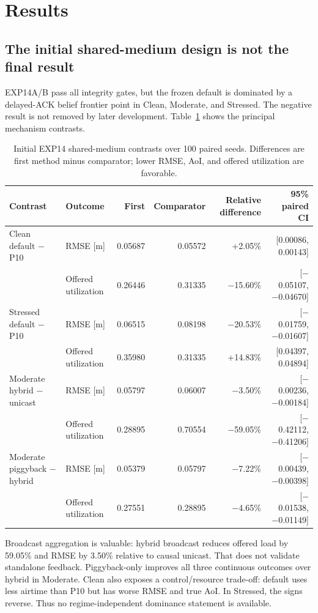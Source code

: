 \section{Results}
\label{sec:s2-results}

\subsection{The initial shared-medium design is not the final result}

EXP14A/B pass all integrity gates, but the frozen default is dominated by a
delayed-ACK belief frontier point in Clean, Moderate, and Stressed. The
negative result is not removed by later development. Table~\ref{tab:s2-initial}
shows the principal mechanism contrasts.

\begin{table}[t]
\centering
\caption{Initial EXP14 shared-medium contrasts over 100 paired seeds.
Differences are first method minus comparator; lower RMSE, AoI, and offered
utilization are favorable.}
\label{tab:s2-initial}
\scriptsize
\begin{tabular}{llrrrr}
\toprule
Contrast & Outcome & First & Comparator & Relative difference & 95\% paired CI \\
\midrule
Clean default $-$ P10 & RMSE [m] & 0.05687 & 0.05572 & +2.05\% & [0.00086, 0.00143] \\
 & Offered utilization & 0.26446 & 0.31335 & $-$15.60\% & [$-$0.05107, $-$0.04670] \\
Stressed default $-$ P10 & RMSE [m] & 0.06515 & 0.08198 & $-$20.53\% & [$-$0.01759, $-$0.01607] \\
 & Offered utilization & 0.35980 & 0.31335 & +14.83\% & [0.04397, 0.04894] \\
Moderate hybrid $-$ unicast & RMSE [m] & 0.05797 & 0.06007 & $-$3.50\% & [$-$0.00236, $-$0.00184] \\
 & Offered utilization & 0.28895 & 0.70554 & $-$59.05\% & [$-$0.42112, $-$0.41206] \\
Moderate piggyback $-$ hybrid & RMSE [m] & 0.05379 & 0.05797 & $-$7.22\% & [$-$0.00439, $-$0.00398] \\
 & Offered utilization & 0.27551 & 0.28895 & $-$4.65\% & [$-$0.01538, $-$0.01149] \\
\bottomrule
\end{tabular}
\end{table}

Broadcast aggregation is valuable: hybrid broadcast reduces offered load by
59.05\% and RMSE by 3.50\% relative to causal unicast. That does not validate
standalone feedback. Piggyback-only improves all three continuous outcomes
over hybrid in Moderate. Clean also exposes a control/resource trade-off:
default uses less airtime than P10 but has worse RMSE and true AoI. In
Stressed, the signs reverse. Thus no regime-independent dominance statement is
available.


